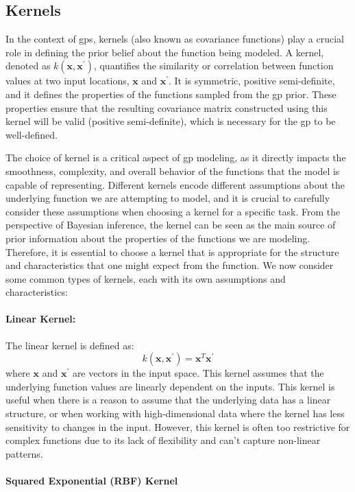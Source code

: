 \subsection{Kernels}
\label{section:kernels}
In the context of \acfp{gp}, kernels (also known as covariance functions) play a crucial role in defining the prior belief about the function being modeled. A kernel, denoted as $k(\mathbf{x}, \mathbf{x}^\prime)$, quantifies the similarity or correlation between function values at two input locations, $\mathbf{x}$ and $\mathbf{x}^\prime$. It is symmetric, positive semi-definite, and it defines the properties of the functions sampled from the \ac{gp} prior. These properties ensure that the resulting covariance matrix constructed using this kernel will be valid (positive semi-definite), which is necessary for the \ac{gp} to be well-defined.

The choice of kernel is a critical aspect of \ac{gp} modeling, as it directly impacts the smoothness, complexity, and overall behavior of the functions that the model is capable of representing. Different kernels encode different assumptions about the underlying function we are attempting to model, and it is crucial to carefully consider these assumptions when choosing a kernel for a specific task. From the perspective of Bayesian inference, the kernel can be seen as the main source of prior information about the properties of the functions we are modeling. Therefore, it is essential to choose a kernel that is appropriate for the structure and characteristics that one might expect from the function. We now consider some common types of kernels, each with its own assumptions and characteristics:

\paragraph{Linear Kernel:}
The linear kernel is defined as:
\[k(\mathbf{x}, \mathbf{x}^\prime) = \mathbf{x}^T \mathbf{x}^\prime\]
where $\mathbf{x}$ and $\mathbf{x}^\prime$ are vectors in the input space. This kernel assumes that the underlying function values are linearly dependent on the inputs. This kernel is useful when there is a reason to assume that the underlying data has a linear structure, or when working with high-dimensional data where the kernel has less sensitivity to changes in the input. However, this kernel is often too restrictive for complex functions due to its lack of flexibility and can't capture non-linear patterns. 

\paragraph{Squared Exponential (RBF) Kernel}

